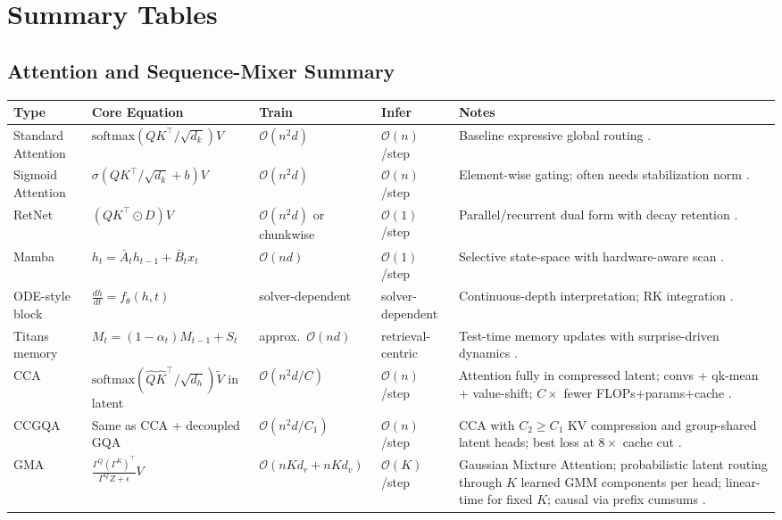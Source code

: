 \section{Summary Tables}
\label{sec:summary-tables}

\subsection{Attention and Sequence-Mixer Summary}
\small
\begin{longtable}{p{2.4cm}p{3.2cm}p{2.0cm}p{2.0cm}p{4.8cm}}
\toprule
\textbf{Type} & \textbf{Core Equation} & \textbf{Train} & \textbf{Infer} & \textbf{Notes} \\
\midrule
\endhead
Standard Attention & $\text{softmax}(QK^\top/\sqrt{d_k})V$ & $\mathcal{O}(n^2d)$ & $\mathcal{O}(n)$/step & Baseline expressive global routing \citep{vaswani_attention_2017}. \\
Sigmoid Attention & $\sigma(QK^\top/\sqrt{d_k}+b)V$ & $\mathcal{O}(n^2d)$ & $\mathcal{O}(n)$/step & Element-wise gating; often needs stabilization norm \citep{ramapuram_theory_2024}. \\
RetNet & $(QK^\top\odot D)V$ & $\mathcal{O}(n^2d)$ or chunkwise & $\mathcal{O}(1)$/step & Parallel/recurrent dual form with decay retention \citep{sun_retentive_2023}. \\
Mamba & $h_t=\bar{A}_t h_{t-1}+\bar{B}_t x_t$ & $\mathcal{O}(nd)$ & $\mathcal{O}(1)$/step & Selective state-space with hardware-aware scan \citep{gu_mamba_2023}. \\
ODE-style block & $\frac{dh}{dt}=f_\theta(h,t)$ & solver-dependent & solver-dependent & Continuous-depth interpretation; RK integration \citep{zhang_continuous_2021}. \\
Titans memory & $M_t=(1-\alpha_t)M_{t-1}+S_t$ & approx.\ $\mathcal{O}(nd)$ & retrieval-centric & Test-time memory updates with surprise-driven dynamics \citep{behrouz_titans_2025}. \\
CCA & $\text{softmax}(\hat Q\hat K^\top/\sqrt{d_h})\tilde V$ in latent & $\mathcal{O}(n^2d/C)$ & $\mathcal{O}(n)$/step & Attention fully in compressed latent; convs + qk-mean + value-shift; $C{\times}$ fewer FLOPs+params+cache \citep{figliola_cca_2025}. \\
CCGQA & Same as CCA + decoupled GQA & $\mathcal{O}(n^2d/C_1)$ & $\mathcal{O}(n)$/step & CCA with $C_2\geq C_1$ KV compression and group-shared latent heads; best loss at $8{\times}$ cache cut \citep{figliola_cca_2025}. \\
GMA & $\frac{\Gamma^Q(\Gamma^K)^\top}{\Gamma^Q Z+\epsilon}V$ & $\mathcal{O}(nKd_r+nKd_v)$ & $\mathcal{O}(K)$/step & Gaussian Mixture Attention; probabilistic latent routing through $K$ learned GMM components per head; linear-time for fixed $K$; causal via prefix cumsums \citep{huang_gma_2026}. \\
\bottomrule
\end{longtable}
\normalsize

